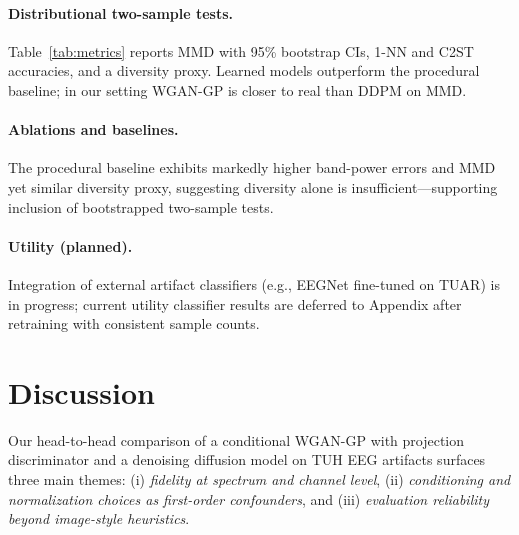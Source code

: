 \documentclass{article}
\begin{document}
\begin{table}[t]
  \centering
  \caption{Per-channel mean differences and aggregate effects (auto-generated).}
  \label{tab:chan-effects}
  
\end{table}

\paragraph{Distributional two-sample tests.} Table~\ref{tab:metrics} reports MMD with 95\% bootstrap CIs, 1-NN and C2ST accuracies, and a diversity proxy. Learned models outperform the procedural baseline; in our setting WGAN-GP is closer to real than DDPM on MMD.

\begin{table}[t]
  \centering
  \caption{Distributional metrics: MMD (95\% CI), 1-NN, C2ST, diversity proxy (auto-generated).}
  \label{tab:metrics}
  
\end{table}

\paragraph{Ablations and baselines.} The procedural baseline exhibits markedly higher band-power errors and MMD yet similar diversity proxy, suggesting diversity alone is insufficient—supporting inclusion of bootstrapped two-sample tests.

\paragraph{Utility (planned).} Integration of external artifact classifiers (e.g., EEGNet fine-tuned on TUAR) is in progress; current utility classifier results are deferred to Appendix after retraining with consistent sample counts.


\section{Discussion}
Our head-to-head comparison of a conditional WGAN-GP with projection discriminator and a denoising diffusion model on TUH EEG artifacts surfaces three main themes: (i) \emph{fidelity at spectrum and channel level}, (ii) \emph{conditioning and normalization choices as first-order confounders}, and (iii) \emph{evaluation reliability beyond image-style heuristics}.
\end{document}

